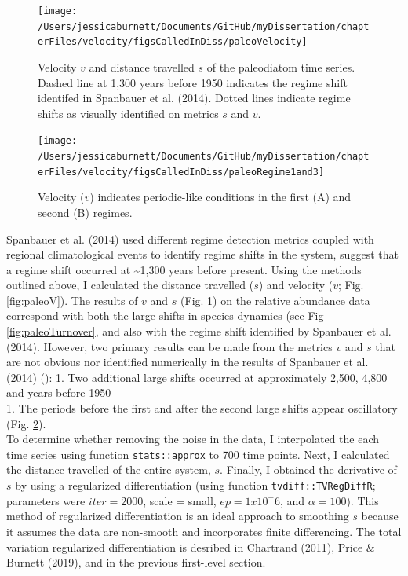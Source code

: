 \documentclass[12pt,twoside,openany]{reedthesis}
\begin{document}
\begin{figure}
\texttt{[image: /Users/jessicaburnett/Documents/GitHub/myDissertation/chapterFiles/velocity/figsCalledInDiss/paleoVelocity]} \caption{Velocity $v$ and distance travelled $s$ of the paleodiatom time series. Dashed line at 1,300 years before 1950 indicates the regime shift identifed in Spanbauer et al. (2014). Dotted lines indicate regime shifts as visually identified on metrics $s$ and $v$.}\label{fig:paleoVelocity}
\end{figure}
\begin{figure}
\texttt{[image: /Users/jessicaburnett/Documents/GitHub/myDissertation/chapterFiles/velocity/figsCalledInDiss/paleoRegime1and3]} \caption{Velocity ($v$) indicates periodic-like conditions in the first (A) and second (B) regimes.}\label{fig:paleoRegime1and3}
\end{figure}
Spanbauer et al. (2014) used different regime detection metrics coupled with regional climatological events to identify regime shifts in the system, suggest that a regime shift occurred at \textasciitilde1,300 years before present. Using the methods outlined above, I calculated the distance travelled (\(s\)) and velocity (\(v\); Fig. \ref{fig:paleoV}). The results of \(v\) and \(s\) (Fig. \ref{fig:paleoVelocity}) on the relative abundance data correspond with both the large shifts in species dynamics (see Fig \ref{fig:paleoTurnover}, and also with the regime shift identified by Spanbauer et al. (2014). However, two primary results can be made from the metrics \(v\) and \(s\) that are not obvious nor identified numerically in the results of Spanbauer et al. (2014) ():
1. Two additional large shifts occurred at approximately 2,500, 4,800 and years before 1950\\
1. The periods before the first and after the second large shifts appear oscillatory (Fig. \ref{fig:paleoRegime1and3}).\\
To determine whether removing the noise in the data, I interpolated the each time series using function \texttt{stats::approx} to 700 time points. Next, I calculated the distance travelled of the entire system, \(s\). Finally, I obtained the derivative of \(s\) by using a regularized differentiation (using function \texttt{tvdiff::TVRegDiffR}; parameters were \(iter = 2000\), scale = small, \(ep = 1 x 10^-6\), and \(\alpha = 100\)). This method of regularized differentiation is an ideal approach to smoothing \(s\) because it assumes the data are non-smooth and incorporates finite differencing. The total variation regularized differentiation is desribed in Chartrand (2011), Price \& Burnett (2019), and in the previous first-level section.
\end{document}
